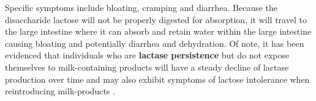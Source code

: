 \documentclass{tufte-handout}
\begin{document}
Specific symptoms include bloating, cramping and diarrhea. Because the disaccharide lactose will not be properly digested for absorption, it will travel to the large intestine  where it can absorb and retain water within the large intestine causing bloating and potentially diarrhea and dehydration. Of note, it has been evidenced that individuals who are \textbf{lactase persistence} but do not expose themselves to milk-containing products will have a steady decline of lactase production over time and may also exhibit symptoms of
lactose intolerance when reintroducing milk-products \citep{Gerbault2011}.




\end{document}
